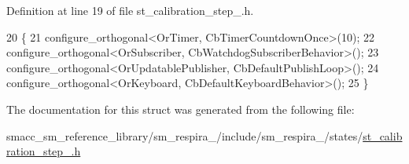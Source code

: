 Definition at line 19 of file st\+\_\+calibration\+\_\+step\+\_.\+h.


\begin{DoxyCode}
20     \{
21         configure\_orthogonal<OrTimer, CbTimerCountdownOnce>(10);
22         configure\_orthogonal<OrSubscriber, CbWatchdogSubscriberBehavior>();
23         configure\_orthogonal<OrUpdatablePublisher, CbDefaultPublishLoop>();
24         configure\_orthogonal<OrKeyboard, CbDefaultKeyboardBehavior>();
25     \}
\end{DoxyCode}


The documentation for this struct was generated from the following file\+:\begin{DoxyCompactItemize}
\item 
smacc\+\_\+sm\+\_\+reference\+\_\+library/sm\+\_\+respira\+\_/include/sm\+\_\+respira\+\_/states/\hyperlink{st__calibration__step__1_8h}{st\+\_\+calibration\+\_\+step\+\_.\+h}\end{DoxyCompactItemize}
